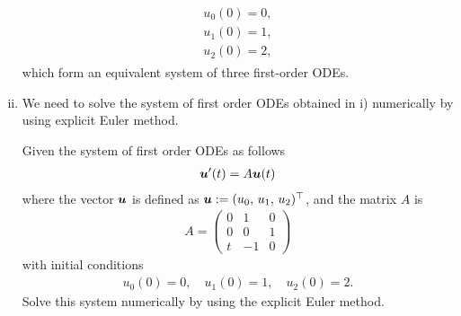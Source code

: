 \documentclass[12pt]{article}
\begin{document}
\begin{enumerate}[i)]
\begin{align}
		      \boxed{
			      \begin{aligned}
				      u_0(0)=0, \\ 
				      u_1(0)=1, \\ 
				      u_2(0)=2,
			      \end{aligned}
		      }
	      \end{align}
	      which form an equivalent system of three first-order ODEs.
	      \newpage
	\item We need to solve the
	      system of first order ODEs obtained in i)
	      numerically by using explicit Euler method.
	      \begin{summaryboxed}
		      Given the system of first order ODEs as follows
		      \begin{align}
			      \label{eq:newBuprime}
			      {\boldsymbol{\mathnormal u}}'(t) = A{\boldsymbol{\mathnormal u}}(t)
		      \end{align}
		      where the vector ${\boldsymbol{\mathnormal u}}$ is defined as 
		      ${\boldsymbol{\mathnormal u}} := (u_{0},\, u_{1},\, u_{2})^{\top}$,
		      and the matrix $A$ is
		      \begin{align}
			      A =
			      \begin{pmatrix}
				      0 & 1 & 0 \\ 0 & 0 & 1 \\ t & -1 & 0
			      \end{pmatrix}
		      \end{align}
		      with initial conditions 
		      \begin{align}
			      u_0(0)=0,\quad u_1(0)=1,\quad u_2(0)=2.
		      \end{align}
		      Solve this system numerically 
		      by using the explicit Euler method.
	      \end{summaryboxed}
	      

\end{enumerate}
\end{document}
